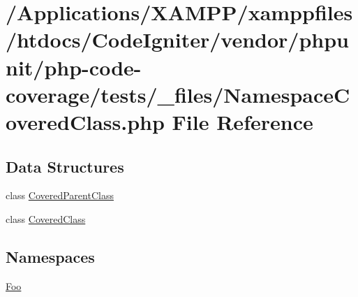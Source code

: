 \hypertarget{php-code-coverage_2tests_2__files_2_namespace_covered_class_8php}{}\section{/\+Applications/\+X\+A\+M\+P\+P/xamppfiles/htdocs/\+Code\+Igniter/vendor/phpunit/php-\/code-\/coverage/tests/\+\_\+files/\+Namespace\+Covered\+Class.php File Reference}
\label{php-code-coverage_2tests_2__files_2_namespace_covered_class_8php}
\subsection*{Data Structures}
\begin{DoxyCompactItemize}
\item 
class \mbox{\hyperlink{class_foo_1_1_covered_parent_class}{Covered\+Parent\+Class}}
\item 
class \mbox{\hyperlink{class_foo_1_1_covered_class}{Covered\+Class}}
\end{DoxyCompactItemize}
\subsection*{Namespaces}
\begin{DoxyCompactItemize}
\item 
 \mbox{\hyperlink{namespace_foo}{Foo}}
\end{DoxyCompactItemize}
